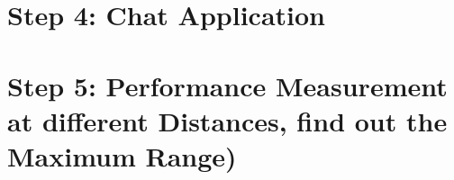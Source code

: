 \documentclass[
	12pt, %
]{fphw}
\begin{document}

\section*{Step 4: Chat Application}



\section*{Step 5: Performance Measurement at different Distances, find out the Maximum Range)}




\clearpage
\printbibliography
\end{document}
